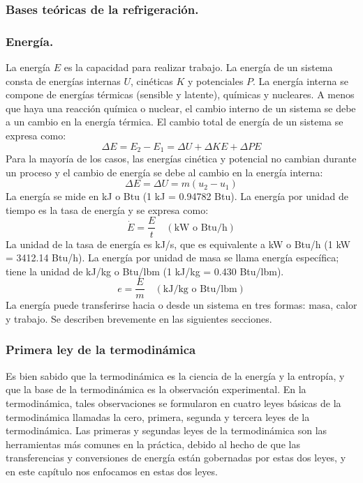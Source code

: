 \subsubsection{Bases teóricas de la refrigeración.}
\subsubsection{Energía.}
La energía $E$ es la capacidad para realizar trabajo. La energía de un sistema consta de energías internas $U$, cinéticas $K$ y potenciales $P$. La energía interna se compone de energías térmicas (sensible y latente), químicas y nucleares. A menos que haya una reacción química o nuclear, el cambio interno de un sistema se debe a un cambio en la energía térmica. El cambio total de energía de un sistema se expresa como:
\begin{equation}
	\Delta E = E_2 - E_1 = \Delta U + \Delta KE + \Delta PE
	\label{eq:energia_total}
\end{equation}
Para la mayoría de los casos, las energías cinética y potencial no cambian durante un proceso y el cambio de energía se debe al cambio en la energía interna:
\begin{equation}
	\Delta E = \Delta U = m(u_2 - u_1)
	\label{eq:energia_interna}
\end{equation}
La energía se mide en kJ o Btu (1 kJ = 0.94782 Btu). La energía por unidad de tiempo es la tasa de energía y se expresa como:
\begin{equation}
	\dot{E} = \frac{E}{t} \quad (\text{kW o Btu/h})
	\label{eq:energia_tasa}
\end{equation}
La unidad de la tasa de energía es kJ/s, que es equivalente a kW o Btu/h (1 kW = 3412.14 Btu/h). La energía por unidad de masa se llama energía específica; tiene la unidad de kJ/kg o Btu/lbm (1 kJ/kg = 0.430 Btu/lbm).
\begin{equation}
	e = \frac{E}{m} \quad (\text{kJ/kg o Btu/lbm})
	\label{eq:energia_especifica}
\end{equation}
La energía puede transferirse hacia o desde un sistema en tres formas: masa, calor y trabajo. Se describen brevemente en las siguientes secciones.

\subsubsection{Primera ley de la termodinámica}

Es bien sabido que la termodinámica es la ciencia de la energía y la entropía, y que la base de la termodinámica es la observación experimental. En la termodinámica, tales observaciones se formularon en cuatro leyes básicas de la termodinámica llamadas la cero, primera, segunda y tercera leyes de la termodinámica. Las primeras y segundas leyes de la termodinámica son las herramientas más comunes en la práctica, debido al hecho de que las transferencias y conversiones de energía están gobernadas por estas dos leyes, y en este capítulo nos enfocamos en estas dos leyes.

